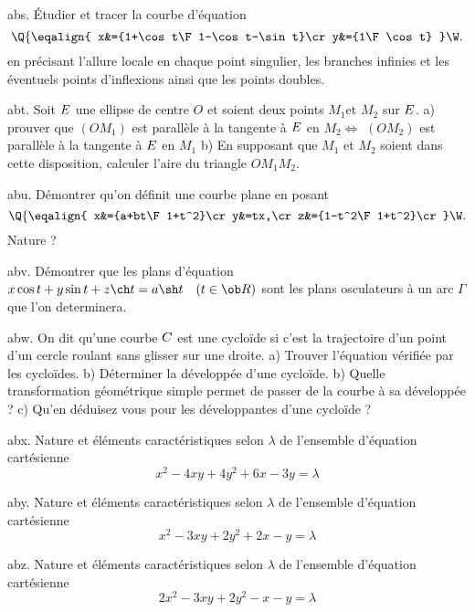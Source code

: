 \exo [Level=1,Fight=0,Learn=1,Field=\CourbesParamétréesCartésiennes,Type=\Exercices,Origin=] abs. 
Étudier et tracer la courbe d'équation 
$$
\Q\{\eqalign{
x&={1+\cos t\F 1-\cos t-\sin t}\cr
y&={1\F\cos t}
}\W.
$$ 
en précisant l'allure  locale en chaque point singulier, les branches infinies 
et les éventuels points d'inflexions ainsi que les points doubles. 

\exo [Level=2,Fight=1,Learn=1,Field=\RepèreDeFrenet,Type=\Exercices,Origin=] abt. 
Soit $\sc E$ une ellipse de centre $O$ et soient deux points $M_1 $et $M_2$ sur $\sc E$. 
\pn
a) prouver que $(OM_1)$ est parallèle à la tangente à $\sc E$ en $M_2\Longleftrightarrow$ 
$(OM_2)$ est parallèle à la tangente à $\sc E$ en $M_1$\pn
b) En supposant que $M_1$ et $M_2$ soient dans cette disposition, 
calculer l'aire du triangle $OM_1M_2$. 

\exo [Level=2,Fight=1,Learn=1,Field=\RepèreDeFrenet,Type=\Exercices,Origin=] abu. 
Démontrer qu'on définit une courbe plane en posant 
$$
\Q\{\eqalign{
x&={a+bt\F1+t^2}\cr 
y&=tx,\cr 
z&={1-t^2\F1+t^2}\cr
}\W.
$$
Nature ? 

\exo [Level=2,Fight=3,Learn=2,Field=\RepèreDeFrenet|\Enveloppes,Type=\Exercices,Origin=\MP] abv. 
Démontrer que les plans d'équation $x\cos t+y\sin t+z\ch t=a\sh t\quad(t\in\ob R)$ 
sont les plans osculateurs à un arc $\Gamma$ que l'on determinera. 

\exo [Level=2,Fight=3,Learn=2,Field=\Roulement|\Développées,Type=\Exercices,Origin=\MP] abw. 
On dit qu'une courbe $\sc C$ est une cycloïde si 
c'est la trajectoire d'un point d'un cercle roulant sans glisser sur une droite. 
\pn
a) Trouver l'équation vérifiée par les cycloïdes. 
b) Déterminer la développée d'une cycloïde. \pn
b) Quelle transformation géométrique simple permet de passer de la courbe à sa développée ?\pn
c) Qu'en déduisez vous pour les développantes d'une cycloïde ? 

\exo [Level=2,Fight=1,Learn=1,Field=\FormesQuadratiques,Type=\Exercices,Origin=] abx. 
Nature et éléments caractéristiques selon $\lambda$ 
de l'ensemble d'équation cartésienne 
$$ 
x^2-4xy+4y^2+6x-3y=\lambda
$$

\exo [Level=2,Fight=1,Learn=1,Field=\FormesQuadratiques,Type=\Exercices,Origin=] aby. 
Nature et éléments caractéristiques selon $\lambda$ 
de l'ensemble d'équation cartésienne 
$$ 
x^2-3xy+2y^2+2x-y=\lambda
$$

\exo [Level=2,Fight=1,Learn=1,Field=\FormesQuadratiques,Type=\Exercices,Origin=] abz. 
Nature et éléments caractéristiques selon $\lambda$ 
de l'ensemble d'équation cartésienne 
$$ 
2x^2-3xy+2y^2-x-y=\lambda
$$

